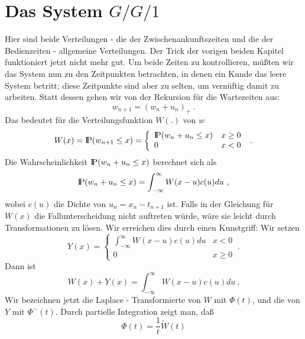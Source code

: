 \section{Das System $G/G/1$}
Hier sind beide Verteilungen - die der Zwischenankunftszeiten und die der
Bedienzeiten - allgemeine Verteilungen. Der Trick der vorigen beiden
Kapitel funktioniert jetzt nicht mehr gut. Um beide Zeiten zu
kontrollieren, müßten wir das System nun zu den Zeitpunkten betrachten,
in denen ein Kunde das leere System betritt; diese Zeitpunkte sind aber zu
selten, um vernüftig damit zu arbeiten. Statt dessen gehen wir von der
Rekursion für die Wartezeiten aus:
\begin{displaymath}
w_{n+1} = (w_{n} + u_{n})_{+} ~.
\end{displaymath}
Das bedeutet für die Verteilungsfunktion $W(.)$ von $w$
\begin{displaymath}
W(x) = {\rm I\kern-0.2em P} (w_{n+1} \leq x) = \left\{
\begin{array}{lc}
{\rm I\kern-0.2em P} (w_{n} + u_{n} \leq x) & x \geq 0 \\
0 & x < 0
\end{array} \right. ~.
\end{displaymath}
Die Wahrscheinlichkeit ${\rm I\kern-0.2em P} (w_{n}+ u_{n} \leq x)$ berechnet sich als
\begin{displaymath}
{\rm I\kern-0.2em P} (w_{n} + u_{n} \leq x) = \int_{- \infty}^{\infty} W(x-u) c(u) du ~,
\end{displaymath}
wobei $c(u)$ die Dichte von $u_{n} = x_{n} - t_{n+1}$ ist. Falls in der
Gleichung für $W(x)$ die Fallunterscheidung nicht auftreten würde, wäre
sie leicht durch Transformationen zu lösen. Wir erreichen dies durch
einen Kunstgriff: Wir setzen
\begin{displaymath}
Y(x) = \left\{
\begin{array}{lc}
\int_{- \infty}^{\infty} W(x-u)c(u) du &  x< 0 \\
0 &  x \geq 0
\end{array} \right. ~.
\end{displaymath}
Dann ist
\begin{displaymath}
W(x) + Y(x) = \int_{-\infty}^{\infty} W(x-u) c(u) du ~.
\end{displaymath}
Wir bezeichnen jetzt die Laplace - Transformierte von $W$ mit $\Phi (t)$,
und die von $Y$ mit $\Phi^{-}(t)$. Durch partielle Integration zeigt man,
daß
\begin{displaymath}
\Phi (t) = \frac{1}{t} \tilde W(t)
\end{displaymath}

